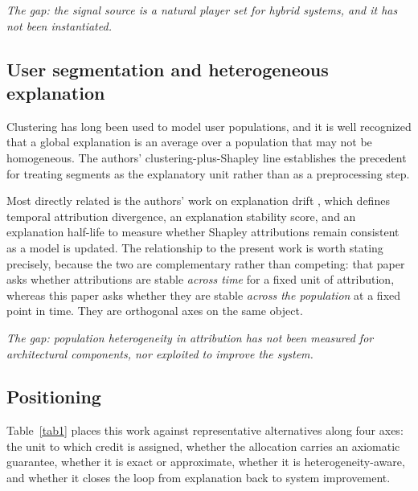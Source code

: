 \documentclass[pdflatex,sn-mathphys-num]{sn-jnl}%
\theoremstyle{thmstyleone}%
\theoremstyle{thmstyletwo}%
\theoremstyle{thmstylethree}%
\begin{document}
\emph{The gap: the signal source is a natural player set for hybrid systems, and it has not been instantiated.}

\subsection{User segmentation and heterogeneous explanation}\label{subsec2_5}

Clustering has long been used to model user populations, and it is well recognized that a global explanation is an average over a population that may not be homogeneous. The authors' clustering-plus-Shapley line \cite{louhichi2023,louhichi2025} establishes the precedent for treating segments as the explanatory unit rather than as a preprocessing step.

Most directly related is the authors' work on explanation drift \cite{nesmaoui2026drift}, which defines temporal attribution divergence, an explanation stability score, and an explanation half-life to measure whether Shapley attributions remain consistent as a model is updated. The relationship to the present work is worth stating precisely, because the two are complementary rather than competing: that paper asks whether attributions are stable \emph{across time} for a fixed unit of attribution, whereas this paper asks whether they are stable \emph{across the population} at a fixed point in time. They are orthogonal axes on the same object.

\emph{The gap: population heterogeneity in attribution has not been measured for architectural components, nor exploited to improve the system.}

\subsection{Positioning}\label{subsec2_6}

Table~\ref{tab1} places this work against representative alternatives along four axes: the unit to which credit is assigned, whether the allocation carries an axiomatic guarantee, whether it is exact or approximate, whether it is heterogeneity-aware, and whether it closes the loop from explanation back to system improvement.
\end{document}
